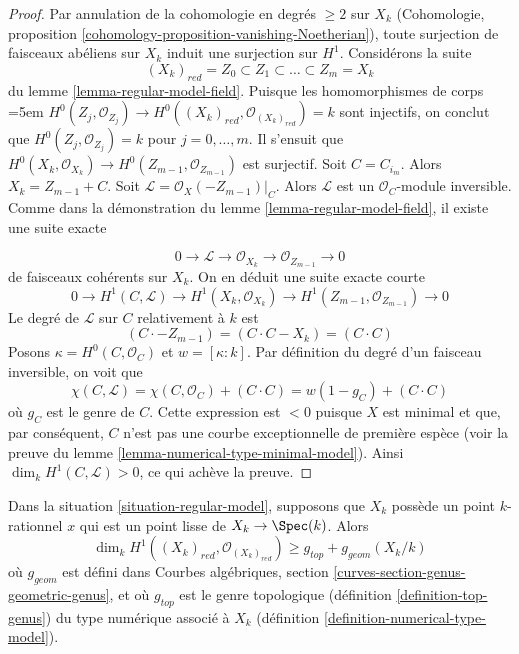 \begin{proof}
Par annulation de la cohomologie en degrés $\geq 2$ sur $X_k$
(Cohomologie, proposition \ref{cohomology-proposition-vanishing-Noetherian}),
toute surjection de faisceaux abéliens sur $X_k$ induit une surjection sur $H^1$.
Considérons la suite
$$
(X_k)_{red} = Z_0 \subset Z_1 \subset \ldots \subset Z_m = X_k
$$
du lemme \ref{lemma-regular-model-field}. Puisque les homomorphismes de corps
\begingroup
\emergencystretch=5em
$H^0(Z_j, \mathcal{O}_{Z_j}) \to
H^0((X_k)_{red}, \mathcal{O}_{(X_k)_{red}}) = k$
sont injectifs, on conclut que $H^0(Z_j, \mathcal{O}_{Z_j}) = k$ pour
$j = 0, \ldots, m$. Il s'ensuit que
$H^0(X_k, \mathcal{O}_{X_k}) \to H^0(Z_{m - 1}, \mathcal{O}_{Z_{m - 1}})$
est surjectif. Soit $C = C_{i_m}$. Alors $X_k = Z_{m - 1} + C$.
Soit $\mathcal{L} = \mathcal{O}_X(-Z_{m - 1})|_C$.
Alors $\mathcal{L}$ est un $\mathcal{O}_C$-module inversible.
Comme dans la démonstration du lemme \ref{lemma-regular-model-field},
il existe une suite exacte
\par
\endgroup
$$
0 \to \mathcal{L} \to \mathcal{O}_{X_k} \to \mathcal{O}_{Z_{m - 1}} \to 0
$$
de faisceaux cohérents sur $X_k$. On en déduit
une suite exacte courte
$$
0 \to
H^1(C, \mathcal{L}) \to H^1(X_k, \mathcal{O}_{X_k}) \to
H^1(Z_{m - 1}, \mathcal{O}_{Z_{m - 1}}) \to 0
$$
Le degré de $\mathcal{L}$ sur $C$ relativement à $k$ est
$$
(C \cdot -Z_{m - 1}) = (C \cdot C - X_k) = (C \cdot C)
$$
Posons $\kappa = H^0(C, \mathcal{O}_C)$ et $w = [\kappa : k]$.
Par définition du degré d'un faisceau inversible, on voit que
$$
\chi(C, \mathcal{L}) =
\chi(C, \mathcal{O}_C) + (C \cdot C) =
w(1 - g_C) + (C \cdot C)
$$
où $g_C$ est le genre de $C$. Cette expression est $< 0$ puisque $X$ est
minimal et que, par conséquent, $C$ n'est pas une courbe exceptionnelle de
première espèce (voir la preuve du lemme
\ref{lemma-numerical-type-minimal-model}). Ainsi
$\dim_k H^1(C, \mathcal{L}) > 0$, ce qui achève la preuve.
\end{proof}

\begin{lemma}
\label{lemma-genus-reduction-bigger-than}
Dans la situation \ref{situation-regular-model}, supposons que $X_k$ possède
un point $k$-rationnel $x$ qui est un point lisse de
$X_k \to \Spec(k)$. Alors
$$
\dim_k H^1((X_k)_{red}, \mathcal{O}_{(X_k)_{red}}) \geq
g_{top} + g_{geom}(X_k/k)
$$
où $g_{geom}$ est défini dans Courbes algébriques, section
\ref{curves-section-genus-geometric-genus}, et où $g_{top}$ est le genre
topologique (définition \ref{definition-top-genus}) du type numérique
associé à $X_k$ (définition \ref{definition-numerical-type-model}).
\end{lemma}

